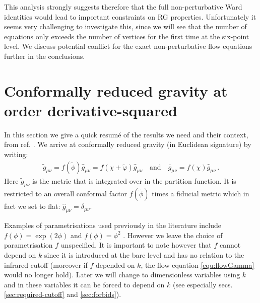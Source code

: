 \documentclass[11pt,draft]{book} %
\begin{document}
This analysis strongly suggests therefore that the full non-perturbative Ward identities would lead
to important constraints on RG properties. Unfortunately it seems very challenging to investigate this,
since we will see that the number of equations only exceeds the number of vertices for the first time
at the six-point level.
We discuss potential conflict for the exact non-perturbative flow equations further in the conclusions.


\section{Conformally reduced gravity at order derivative-squared}
\label{sec:review}

In this section we give a quick resum\'e of the results we need and their context,
from ref. \cite{Dietz:2015owa}.
We arrive at conformally reduced gravity (in Euclidean signature) by writing:
\begin{align}
  \tilde g_{\mu\nu} = f(\tilde\phi) \hat g_{\mu\nu} = f(\chi +\tilde\varphi )\hat g_{\mu\nu}
  \quad \text{and} \quad
  \bar g_{\mu\nu} = f(\chi)\hat g_{\mu\nu} \,.
  \label{conformal-reduction}
\end{align}
Here $\tilde g_{\mu\nu}$ is the metric that is integrated over in the partition function.
It is restricted to an overall conformal factor $f(\tilde\phi)$ times a fiducial metric which
in fact we set to flat: $\hat g_{\mu\nu}=\delta_{\mu\nu}$.

Examples of parametrisations used previously in the literature include
$f(\phi) = \exp(2\phi)$ \cite{Machado:2009ph} and $f(\phi)=\phi^2$ \cite{Manrique:2009uh,Bonanno:2012dg}.
However we leave the choice of parametrisation $f$ unspecified.
It is important to note however that $f$ cannot depend on $k$ since it is introduced at the bare level
and has no relation to the infrared cutoff (moreover if $f$ depended on $k$,
the flow equation \eqref{equ:flowGamma} would no longer hold).
Later we will change to dimensionless variables using $k$ and in these variables it can be forced
to depend on $k$ (see especially secs. \ref{sec:required-cutoff} and \ref{sec:forbids}).
\end{document}
